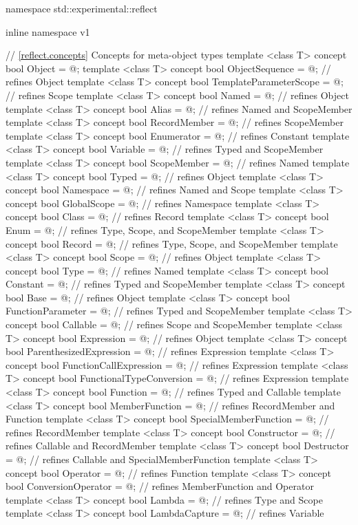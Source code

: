 \begin{std.txt}\color{addclr}
\begin{codeblock}
namespace std::experimental::reflect {
inline namespace v1 {

// \ref{reflect.concepts} Concepts for meta-object types
template <class T>
concept bool Object = @\seebelow@;
template <class T>
concept bool ObjectSequence = @\seebelow@; // refines Object
template <class T>
concept bool TemplateParameterScope = @\seebelow@; // refines Scope
template <class T>
concept bool Named = @\seebelow@;          // refines Object
template <class T>
concept bool Alias = @\seebelow@;          // refines Named and ScopeMember
template <class T>
concept bool RecordMember = @\seebelow@;   // refines ScopeMember
template <class T>
concept bool Enumerator = @\seebelow@;     // refines Constant
template <class T>
concept bool Variable = @\seebelow@;       // refines Typed and ScopeMember
template <class T>
concept bool ScopeMember = @\seebelow@;    // refines Named
template <class T>
concept bool Typed = @\seebelow@;          // refines Object
template <class T>
concept bool Namespace = @\seebelow@;      // refines Named and Scope
template <class T>
concept bool GlobalScope = @\seebelow@;    // refines Namespace
template <class T>
concept bool Class = @\seebelow@;          // refines Record
template <class T>
concept bool Enum = @\seebelow@;           // refines Type, Scope, and ScopeMember
template <class T>
concept bool Record = @\seebelow@;         // refines Type, Scope, and ScopeMember
template <class T>
concept bool Scope = @\seebelow@;          // refines Object
template <class T>
concept bool Type = @\seebelow@;           // refines Named
template <class T>
concept bool Constant = @\seebelow@;       // refines Typed and ScopeMember
template <class T>
concept bool Base = @\seebelow@;           // refines Object
template <class T>
concept bool FunctionParameter = @\seebelow@; // refines Typed and ScopeMember
template <class T>
concept bool Callable = @\seebelow@;       // refines Scope and ScopeMember
template <class T>
concept bool Expression = @\seebelow@;     // refines Object
template <class T>
concept bool ParenthesizedExpression = @\seebelow@;  // refines Expression
template <class T>
concept bool FunctionCallExpression = @\seebelow@;   // refines Expression
template <class T>
concept bool FunctionalTypeConversion = @\seebelow@; // refines Expression
template <class T>
concept bool Function = @\seebelow@;       // refines Typed and Callable
template <class T>
concept bool MemberFunction = @\seebelow@; // refines RecordMember and Function
template <class T>
concept bool SpecialMemberFunction = @\seebelow@; // refines RecordMember
template <class T>
concept bool Constructor = @\seebelow@;    // refines Callable and RecordMember
template <class T>
concept bool Destructor = @\seebelow@;     // refines Callable and SpecialMemberFunction
template <class T>
concept bool Operator = @\seebelow@;       // refines Function
template <class T>
concept bool ConversionOperator = @\seebelow@; // refines MemberFunction and Operator
template <class T>
concept bool Lambda = @\seebelow@;         // refines Type and Scope
template <class T>
concept bool LambdaCapture = @\seebelow@;  // refines Variable


}}
\end{codeblock}
\end{std.txt}
